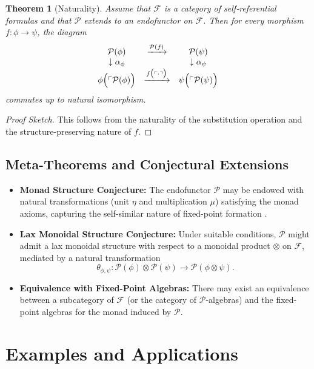 \documentclass[12pt]{amsart}
\theoremstyle{plain}
\newtheorem{theorem}{Theorem}[section]
\theoremstyle{definition}
\theoremstyle{remark}
\begin{document}
\begin{theorem}[Naturality]
Assume that $\mathcal{F}$ is a category of self‐referential formulas and that $\mathcal{P}$ extends to an endofunctor on $\mathcal{F}$. Then for every morphism $f: \phi \to \psi$, the diagram
\[
\begin{array}{ccc}
\mathcal{P}(\phi) & \xrightarrow{\mathcal{P}(f)} & \mathcal{P}(\psi) \\
\downarrow{\alpha_\phi} &  & \downarrow{\alpha_\psi} \\
\phi\Bigl(\ulcorner \mathcal{P}(\phi) \Bigr) & \xrightarrow{f\bigl(\ulcorner \cdot \urcorner\bigr)} & \psi\Bigl(\ulcorner \mathcal{P}(\psi) \Bigr)
\end{array}
\]
commutes up to natural isomorphism.
\end{theorem}
\begin{proof}[Proof Sketch]
This follows from the naturality of the substitution operation and the structure-preserving nature of $f$.
\end{proof}

\subsection{Meta-Theorems and Conjectural Extensions}
\begin{itemize}
    \item \textbf{Monad Structure Conjecture:} The endofunctor $\mathcal{P}$ may be endowed with natural transformations (unit $\eta$ and multiplication $\mu$) satisfying the monad axioms, capturing the self-similar nature of fixed-point formation \cite{Lawvere1969,Milner1989}.
    \item \textbf{Lax Monoidal Structure Conjecture:} Under suitable conditions, $\mathcal{P}$ might admit a lax monoidal structure with respect to a monoidal product $\otimes$ on $\mathcal{F}$, mediated by a natural transformation
    \[
    \theta_{\phi,\psi}: \mathcal{P}(\phi) \otimes \mathcal{P}(\psi) \to \mathcal{P}(\phi \otimes \psi).
    \]
    \item \textbf{Equivalence with Fixed-Point Algebras:} There may exist an equivalence between a subcategory of $\mathcal{F}$ (or the category of $\mathcal{P}$-algebras) and the fixed-point algebras for the monad induced by $\mathcal{P}$.
\end{itemize}

\section{Examples and Applications}
\end{document}
